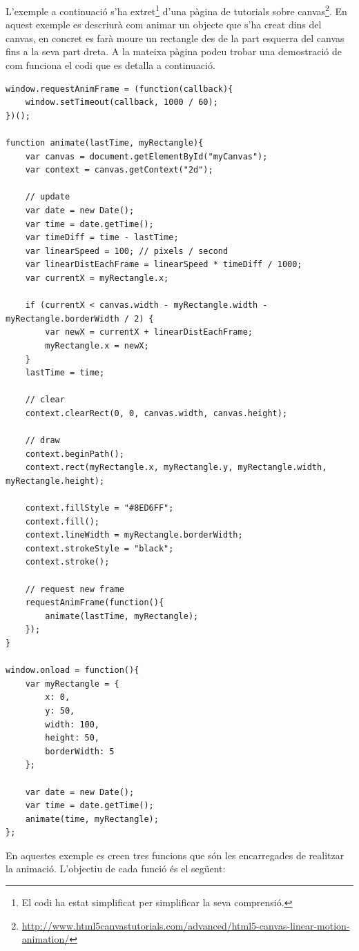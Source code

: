 L'exemple a continuació s'ha extret\footnote{El codi ha estat simplificat per simplificar la seva comprensió.} d'una pàgina de tutorials sobre canvas\footnote{\url{http://www.html5canvastutorials.com/advanced/html5-canvas-linear-motion-animation/}}. En aquest exemple es descriurà com animar un objecte que s'ha creat dins del canvas, en concret es farà moure un rectangle des de la part esquerra del canvas fins a la seva part dreta. A la mateixa pàgina podeu trobar una demostració de com funciona el codi que es detalla a continuació.  

\begin{lstlisting}
window.requestAnimFrame = (function(callback){
    window.setTimeout(callback, 1000 / 60);
})();
 
function animate(lastTime, myRectangle){
    var canvas = document.getElementById("myCanvas");
    var context = canvas.getContext("2d");
 
    // update
    var date = new Date();
    var time = date.getTime();
    var timeDiff = time - lastTime;
    var linearSpeed = 100; // pixels / second
    var linearDistEachFrame = linearSpeed * timeDiff / 1000;
    var currentX = myRectangle.x;
 
    if (currentX < canvas.width - myRectangle.width - myRectangle.borderWidth / 2) {
        var newX = currentX + linearDistEachFrame;
        myRectangle.x = newX;
    }
    lastTime = time;
 
    // clear
    context.clearRect(0, 0, canvas.width, canvas.height);
 
    // draw
    context.beginPath();
    context.rect(myRectangle.x, myRectangle.y, myRectangle.width, myRectangle.height);
 
    context.fillStyle = "#8ED6FF";
    context.fill();
    context.lineWidth = myRectangle.borderWidth;
    context.strokeStyle = "black";
    context.stroke();
 
    // request new frame
    requestAnimFrame(function(){
        animate(lastTime, myRectangle);
    });
}
 
window.onload = function(){
    var myRectangle = {
        x: 0,
        y: 50,
        width: 100,
        height: 50,
        borderWidth: 5
    };
 
    var date = new Date();
    var time = date.getTime();
    animate(time, myRectangle);
};
\end{lstlisting}

En aquestes exemple es creen tres funcions que són les encarregades de realitzar la animació. L'objectiu de cada funció és el següent:

